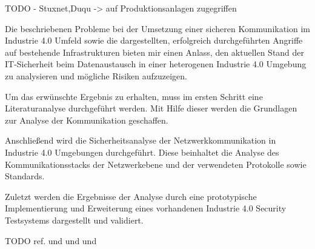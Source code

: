 TODO - Stuxnet,Duqu -> auf Produktionsanlagen zugegriffen

Die beschriebenen Probleme bei der Umsetzung einer sicheren Kommunikation im Industrie 4.0 Umfeld sowie die dargestellten, erfolgreich durchgeführten Angriffe auf bestehende Infrastrukturen bieten mir einen Anlass, den aktuellen Stand der IT-Sicherheit beim Datenaustausch in einer heterogenen Industrie 4.0 Umgebung zu analysieren und mögliche Risiken aufzuzeigen.

Um das erwünschte Ergebnis zu erhalten, muss im ersten Schritt eine Literaturanalyse durchgeführt werden. Mit Hilfe dieser werden die Grundlagen zur Analyse der Kommunikation geschaffen. 

Anschließend wird die Sicherheitsanalyse der Netzwerkkommunikation in Industrie 4.0 Umgebungen durchgeführt. Diese beinhaltet die Analyse des Kommunikationsstacks der Netzwerkebene und der verwendeten Protokolle sowie Standards.

Zuletzt werden die Ergebnisse der Analyse durch eine prototypische Implementierung und Erweiterung eines vorhandenen Industrie 4.0 Security Testsystems dargestellt und validiert. 

TODO ref. \cite{Halang2016} und \cite{BMWiSuK2016} und \cite{Schleupner2016} und \cite{Sander2014}